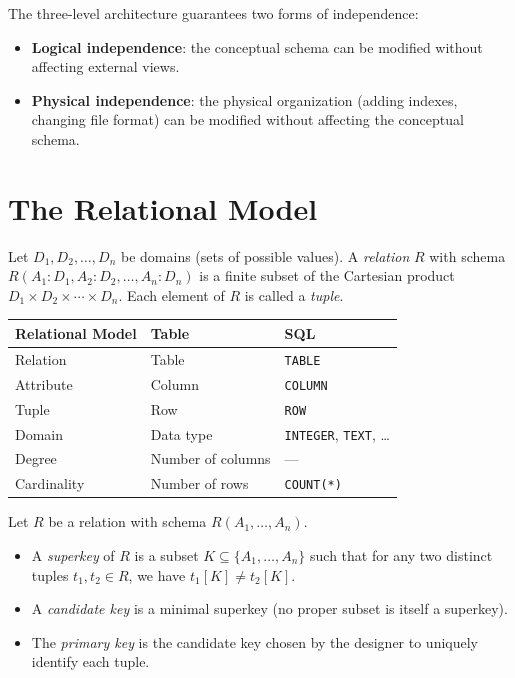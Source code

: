 \begin{theorem}
The three-level architecture guarantees two forms of independence:
\begin{itemize}
    \item \textbf{Logical independence}: the conceptual schema can be modified
          without affecting external views.
    \item \textbf{Physical independence}: the physical organization (adding
          indexes, changing file format) can be modified without affecting
          the conceptual schema.
\end{itemize}
\end{theorem}

\section{The Relational Model}

\begin{definition}[Relation]
Let $D_1, D_2, \ldots, D_n$ be domains (sets of possible values).
A \emph{relation} $R$ with schema $R(A_1:D_1, A_2:D_2, \ldots, A_n:D_n)$
is a finite subset of the Cartesian product $D_1 \times D_2 \times \cdots \times D_n$.
Each element of $R$ is called a \emph{tuple}.
\end{definition}

\begin{keyformulas}[title=\textbf{Relational vs.\ Tabular Terminology}]
\begin{center}
\begin{tabular}{lll}
\toprule
\textbf{Relational Model} & \textbf{Table} & \textbf{SQL} \\
\midrule
Relation & Table & \texttt{TABLE} \\
Attribute & Column & \texttt{COLUMN} \\
Tuple & Row & \texttt{ROW} \\
Domain & Data type & \texttt{INTEGER}, \texttt{TEXT}, \ldots \\
Degree & Number of columns & --- \\
Cardinality & Number of rows & \texttt{COUNT(*)} \\
\bottomrule
\end{tabular}
\end{center}
\end{keyformulas}

\begin{definition}
Let $R$ be a relation with schema $R(A_1, \ldots, A_n)$.
\begin{itemize}
    \item A \emph{superkey} of $R$ is a subset $K \subseteq \{A_1, \ldots, A_n\}$
          such that for any two distinct tuples $t_1, t_2 \in R$, we have $t_1[K] \neq t_2[K]$.
    \item A \emph{candidate key} is a minimal superkey (no proper subset is
          itself a superkey).
    \item The \emph{primary key} is the candidate key chosen by the designer to
          uniquely identify each tuple.
\end{itemize}
\end{definition}


